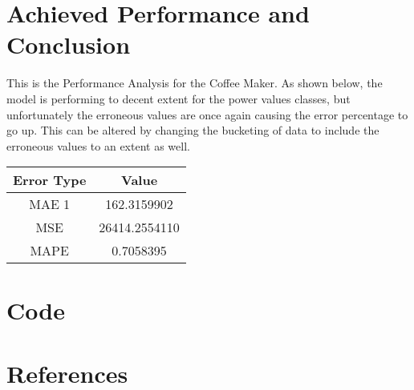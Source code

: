 \documentclass{report}
\begin{document}
\section{Achieved Performance and Conclusion}

This is the Performance Analysis for the Coffee Maker. As shown below, the model is performing to decent extent for the power values classes, but unfortunately the erroneous values are once again causing the error percentage to go up. This can be altered by changing the bucketing of data to include the erroneous values to an extent as well.

\begin{table}[h]
    \centering
    \begin{tabular}{|c|c|}
        \hline
        \textbf{Error Type} & \textbf{Value} \\
        \hline
        MAE 1 & 162.3159902 \\
        \hline
        MSE & 26414.2554110 \\
        \hline
        MAPE & 0.7058395 \\
        \hline
    \end{tabular}
\end{table}

\newpage %
\section{Code}


\section{References}
\end{document}
